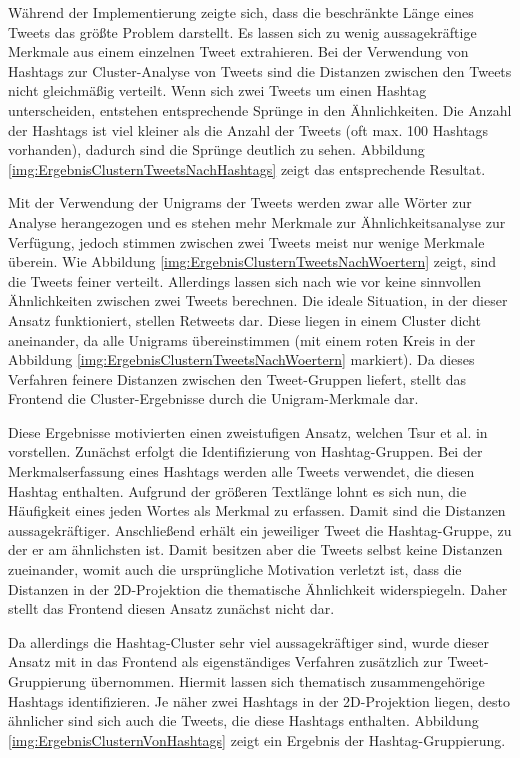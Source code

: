 Während der Implementierung zeigte sich, dass die beschränkte Länge eines Tweets das größte Problem darstellt. Es lassen sich zu wenig aussagekräftige Merkmale aus einem einzelnen Tweet extrahieren. Bei der Verwendung von Hashtags zur Cluster-Analyse von Tweets sind die Distanzen zwi\-schen den Tweets nicht gleichmäßig verteilt. Wenn sich zwei Tweets um einen Hashtag unterscheiden, entstehen entsprechende Sprünge in den Ähnlichkeiten. Die Anzahl der Hashtags ist viel kleiner als die Anzahl der
Tweets (oft max. 100 Hashtags vorhanden), dadurch sind die Sprünge deutlich zu sehen. Abbildung \ref{img:ErgebnisClusternTweetsNachHashtags} zeigt das entsprechende Resultat.

Mit der Verwendung der Unigrams der Tweets werden zwar alle Wörter zur Analyse herangezogen und es stehen mehr Merkmale zur Ähnlichkeitsanalyse zur Verfügung, jedoch stimmen zwi\-schen zwei Tweets meist nur wenige Merkmale überein. Wie Abbildung \ref{img:ErgebnisClusternTweetsNachWoertern} zeigt, sind die Tweets feiner verteilt. Allerdings lassen sich nach wie vor keine sinnvollen Ähnlichkeiten zwi\-schen zwei Tweets berechnen. Die ideale Situation, in der dieser Ansatz funktioniert, stellen Retweets dar. Diese liegen in einem Cluster dicht aneinander, da alle Unigrams übereinstimmen (mit einem roten Kreis in der Abbildung \ref{img:ErgebnisClusternTweetsNachWoertern} markiert). Da dieses Verfahren feinere Distanzen zwi\-schen den Tweet-Gruppen liefert, stellt das Frontend die Cluster-Ergebnisse durch die Unigram-Merkmale dar.


Diese Ergebnisse motivierten einen zweistufigen Ansatz, welchen Tsur et al. in \cite{TsurLittman} vorstellen. Zunächst erfolgt die Identifizierung von Hashtag-Gruppen. 
Bei der Merkmals\-erfassung eines Hashtags werden alle Tweets verwendet, die diesen Hashtag enthalten. 
Aufgrund der größeren Textlänge lohnt es sich nun, die Häufigkeit eines jeden Wortes als Merkmal zu erfassen. 
Damit sind die Distanzen aussagekräftiger. Anschließend erhält ein jeweiliger Tweet die Hashtag-Gruppe, zu der er am 
ähnlichsten ist. Damit besitzen aber die Tweets selbst keine Distanzen zueinander, womit auch die ursprüngliche 
Motivation verletzt ist, dass die Distanzen in der 2D-Projektion die thematische Ähnlichkeit widerspiegeln.
Daher stellt das Frontend diesen Ansatz zunächst nicht dar.

Da allerdings die Hashtag-Cluster sehr viel aussagekräftiger sind, wurde dieser Ansatz mit in das Frontend 
als eigenständiges Verfahren zusätzlich zur Tweet-Gruppierung übernommen. Hiermit lassen sich thematisch 
zusammengehörige Hashtags identifizieren. Je näher zwei Hashtags in der 2D-Projektion liegen, desto ähnlicher 
sind sich auch die Tweets, die diese Hashtags enthalten. Abbildung \ref{img:ErgebnisClusternVonHashtags} 
zeigt ein Ergebnis der Hashtag-Gruppierung.

